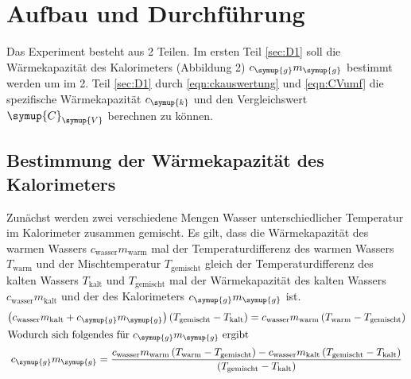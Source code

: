 \section{Aufbau und Durchführung}
\label{sec:Durchführung}
Das Experiment besteht aus 2 Teilen. Im ersten Teil \ref{sec:D1} soll die Wärmekapazität
des Kalorimeters (Abbildung 2) $c_\symup{g}m_\symup{g}$ bestimmt werden um im 2.
Teil \ref{sec:D1} durch \eqref{eqn:ckauswertung} und \eqref{eqn:CVumf} die
spezifische Wärmekapazität $c_\symup{k}$ und den Vergleichswert $\symup{C}_\symup{V}$
berechnen zu können.
\subsection{Bestimmung der Wärmekapazität des Kalorimeters}
Zunächst werden zwei verschiedene Mengen Wasser unterschiedlicher Temperatur
im Kalorimeter zusammen gemischt.
Es gilt, dass die Wärmekapazität des warmen Wassers
$c_\text{wasser}m_\text{warm}$ mal der Temperaturdifferenz des warmen Wassers
$T_\text{warm}$ und der Mischtemperatur $T_\text{gemischt}$ gleich der
Temperaturdifferenz des kalten Wassers $T_\text{kalt}$ und $T_\text{gemischt}$
mal der Wärmekapazität des kalten Wassers $c_\text{wasser}m_\text{kalt}$
und der des Kalorimeters $c_\symup{g}m_\symup{g}$ ist.
\begin{gather}
  \left(c_\text{wasser}m_\text{kalt}+c_\symup{g}m_\symup{g}\right)
  \left(T_\text{gemischt}-T_\text{kalt}\right)
  = c_\text{wasser}m_\text{warm}\left(T_\text{warm}-T_\text{gemischt}\right)
  \label{eqn:cgmg}\\
  \intertext{Wodurch sich folgendes für $c_\symup{g}m_\symup{g}$ ergibt}
  c_\symup{g}m_\symup{g} = \frac
  {c_\text{wasser}m_\text{warm}\left(T_\text{warm}-T_\text{gemischt}\right)
  -c_\text{wasser}m_\text{kalt}\left(T_\text{gemischt}-T_\text{kalt}\right)}
  {\left(T_\text{gemischt}-T_\text{kalt}\right)}
  \label{eqn:cgmgumf}
\end{gather}
\label{sec:D1}
